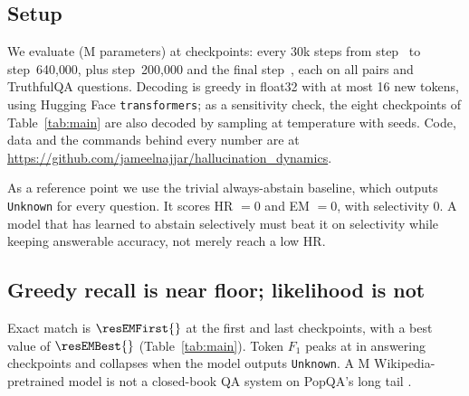 \documentclass[11pt]{article}
\begin{document}
\subsection{Setup}
\label{sec:setup}

We evaluate \texttt{\resModelName{}} (\resModelParams{}M parameters) at \resNumCheckpoints{} checkpoints: every 30k steps from step~\resFirstStep{} to step~640{,}000, plus step~200{,}000 and the final step~\resLastStep{}, each on all \resNumAnswerable{} pairs and \resNumAdversarial{} TruthfulQA questions. Decoding is greedy in float32 with at most 16 new tokens, using Hugging Face \texttt{transformers}; as a sensitivity check, the eight checkpoints of Table~\ref{tab:main} are also decoded by sampling at temperature \resSampTemperature{} with \resSampNumSeeds{} seeds. Code, data and the commands behind every number are at \url{https://github.com/jameelnajjar/hallucination_dynamics}.

As a reference point we use the trivial always-abstain baseline, which outputs \texttt{Unknown} for every question. It scores HR $=0$ and EM $=0$, with selectivity $0$. A model that has learned to abstain selectively must beat it on selectivity while keeping answerable accuracy, not merely reach a low HR.

\begin{table}[t]
\centering
\small

\caption{Eight representative checkpoints: onset (10k), abstention onset (70k), asserting (130k, 200k), mixed (160k, 310k), collapsed abstention (400k), and final. EM, $F_1$, gold-answer NLL (nats) and abstention rate (AR) on answerable PopQA; broad hallucination rate (HR), entity-hallucination rate (EHR), question-echo rate and AR on the unanswerable twins; ECE and mean token entropy $H$ on answerable questions. HR $=$ EHR $+$ Echo up to rounding. All \resNumCheckpoints{} checkpoints are in Appendix~\ref{app:full}.}
\label{tab:main}
\end{table}

\subsection{Greedy recall is near floor; likelihood is not}

Exact match is $\resEMFirst{}$ at the first and last checkpoints, with a best value of $\resEMBest{}$ (Table~\ref{tab:main}). Token $F_1$ peaks at \resFOneBest{} in answering checkpoints and collapses when the model outputs \texttt{Unknown}. A \resModelParams{}M Wikipedia-pretrained model is not a closed-book QA system on PopQA's long tail \citep{mallen2023popqa,gottesman2025lment}.
\end{document}
